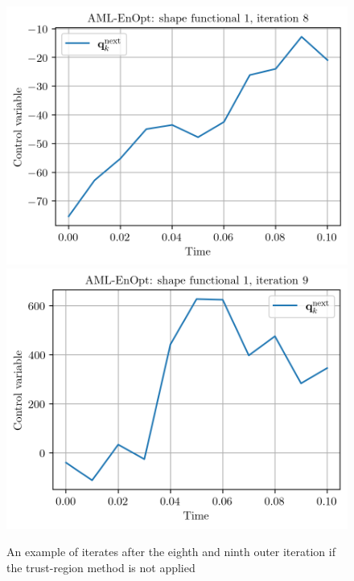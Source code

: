 \begin{figure}
\centering
\includegraphics{Plots/noTRIteration8.png}
\includegraphics{Plots/noTRIteration9.png}
\caption{\label{noTRResults}An example of iterates after the eighth and ninth outer iteration if the trust-region method is not applied}
\end{figure}

